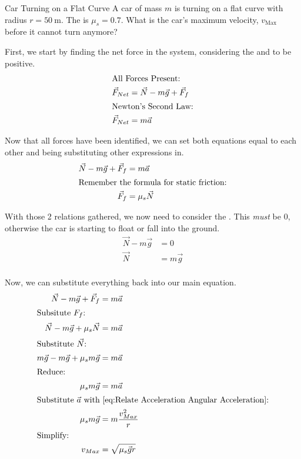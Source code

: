 \begin{example}[]{Car Turning on a Flat Curve}
  A car of mass $m$ is turning on a flat curve with radius $r = \SI{50}{\meter}$.
  The  is $\mu_{s} = 0.7$.
  What is the car's maximum velocity, $v_{\text{Max}}$ before it cannot turn anymore?
  \tcblower{}

  First, we start by finding the net force in the system, considering the  and  to be positive.
  \begin{align*}
    \shortintertext{All Forces Present:}
    \vec{F}_{Net} &= \vec{N} - m\vec{g} + \vec{F}_{f} \\
    \shortintertext{Newton's Second Law:}
    \vec{F}_{Net} &= m\vec{a} \\
  \end{align*}

  Now that all forces have been identified, we can set both equations equal to each other and being substituting other expressions in.
  \begin{align*}
    \vec{N} - m\vec{g} + \vec{F}_{f} &= m\vec{a} \\
    \shortintertext{Remember the formula for static friction:}
    \vec{F}_{f} &= \mu_{s} \vec{N} \\
  \end{align*}

  With those 2 relations gathered, we now need to consider the .
  This \emph{must} be $0$, otherwise the car is starting to float or fall into the ground.
  \begin{align*}
    \vec{N} - m\vec{g} &= 0 \\
    \vec{N} &= m\vec{g} \\
  \end{align*}

  Now, we can substitute everything back into our main equation.
  \begin{align*}
    \vec{N} - m\vec{g} + \vec{F}_{f} &= m\vec{a} \\
    \shortintertext{Subsitute $F_{f}$:}
    \vec{N} - m\vec{g} + \mu_{s}\vec{N} &= m\vec{a} \\
    \shortintertext{Substitute $\vec{N}$:}
    m\vec{g} - m\vec{g} + \mu_{s} m\vec{g} &= m\vec{a} \\
    \shortintertext{Reduce:}
    \mu_{s} m\vec{g} &= m\vec{a} \\
    \shortintertext{Substitute $\vec{a}$ with \Cref{eq:Relate Acceleration Angular Acceleration}:}
    \mu_{s} m\vec{g} &= m \frac{v_{Max}^{2}}{r} \\
    \shortintertext{Simplify:}
    v_{Max} &= \sqrt{\mu_{s} \vec{g} r} \\
  \end{align*}


\end{example}
